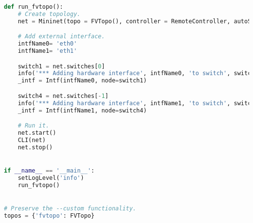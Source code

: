 \begin{lstlisting}[language=Python]
def run_fvtopo():
	# Create topology.
	net = Mininet(topo = FVTopo(), controller = RemoteController, autoSetMacs = True, autoStaticArp = False, link = TCLink)

	# Add external interface.
	intfName0= 'eth0'
	intfName1= 'eth1'

	switch1 = net.switches[0]
	info('*** Adding hardware interface', intfName0, 'to switch', switch1.name, '\n')
	_intf = Intf(intfName0, node=switch1)

	switch4 = net.switches[-1]
	info('*** Adding hardware interface', intfName1, 'to switch', switch4.name, '\n')
	_intf = Intf(intfName1, node=switch4)

	# Run it.
	net.start()
	CLI(net)
	net.stop()


if __name__ == '__main__':
	setLogLevel('info')
	run_fvtopo()


# Preserve the --custom functionality.
topos = {'fvtopo': FVTopo}
\end{lstlisting}